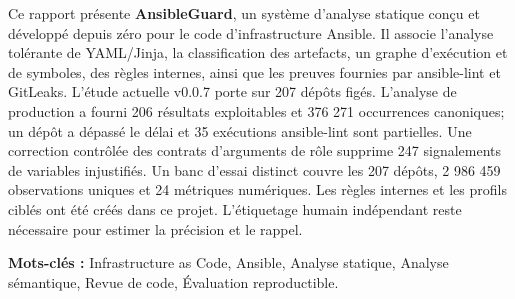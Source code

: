 \noindent\large
Ce rapport présente \textbf{AnsibleGuard}, un système d'analyse statique conçu
et développé depuis zéro pour le code d'infrastructure Ansible. Il associe
l'analyse tolérante de YAML/Jinja, la classification des artefacts, un graphe
d'exécution et de symboles, des règles internes, ainsi que les preuves fournies
par ansible-lint et GitLeaks. L'étude actuelle v0.0.7 porte sur 207 dépôts
figés. L'analyse de production a fourni 206 résultats exploitables et
376 271 occurrences canoniques; un dépôt a dépassé le délai et 35 exécutions
ansible-lint sont partielles. Une correction contrôlée des contrats d'arguments
de rôle supprime 247 signalements de variables injustifiés. Un banc d'essai
distinct couvre les 207 dépôts, 2 986 459 observations uniques et 24 métriques
numériques. Les règles internes et les profils ciblés ont été créés dans ce
projet. L'étiquetage humain indépendant reste nécessaire pour estimer la
précision et le rappel.

\medskip
\noindent\textbf{Mots-clés :} Infrastructure as Code, Ansible, Analyse
statique, Analyse sémantique, Revue de code, Évaluation reproductible.
